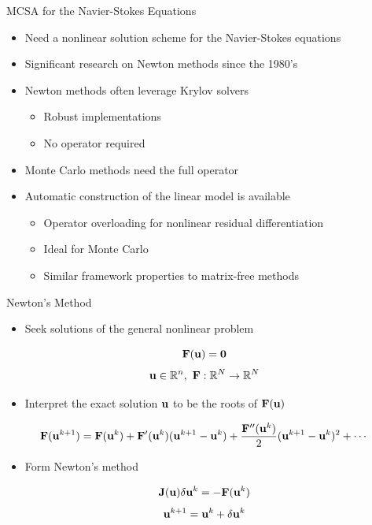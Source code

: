\documentclass{beamer}
\begin{document}
\begin{frame}{MCSA for the Navier-Stokes Equations}

  \begin{itemize}
  \item Need a nonlinear solution scheme for the Navier-Stokes equations
    \bigskip
  \item Significant research on Newton methods since the 1980's
    \bigskip
  \item Newton methods often leverage Krylov solvers
    \begin{itemize}
    \item Robust implementations
    \item No operator required
    \end{itemize}
    \bigskip
  \item Monte Carlo methods need the full operator
    \bigskip
  \item Automatic construction of the linear model is available
    \begin{itemize}
    \item Operator overloading for nonlinear residual differentiation
    \item Ideal for Monte Carlo
    \item Similar framework properties to matrix-free methods
    \end{itemize}
  \end{itemize}

\end{frame}

\begin{frame}{Newton's Method}

  \begin{itemize}
  \item Seek solutions of the general nonlinear problem
  \end{itemize}

  \[
  \mathbf{F}(\mathbf{u}) = \mathbf{0}
  \]
  \[
  \mathbf{u} \in \mathbb{R}^n,\ \mathbf{F}:\mathbb{R}^N \rightarrow
  \mathbb{R}^N
  \]

  \begin{itemize}
  \item Interpret the exact solution $\mathbf{u}$ to be the roots of
    $\mathbf{F}(\mathbf{u})$
  \end{itemize}

  \[
  \mathbf{F}(\mathbf{u}^{k+1}) = \mathbf{F}(\mathbf{u}^{k}) +
  \mathbf{F}'(\mathbf{u}^{k})(\mathbf{u}^{k+1}-\mathbf{u}^{k}) +
  \frac{\mathbf{F}''(\mathbf{u}^{k})}{2}(\mathbf{u}^{k+1}-\mathbf{u}^{k})^2 + \cdots
  \]

  \begin{itemize}
  \item Form Newton's method
  \end{itemize}
  \[
  \mathbf{J}(\mathbf{u}) \delta \mathbf{u}^k = -\mathbf{F}(\mathbf{u}^{k})
  \]
  \[
  \mathbf{u}^{k+1} = \mathbf{u}^k + \delta \mathbf{u}^k
  \]

\end{frame}
\end{document}
